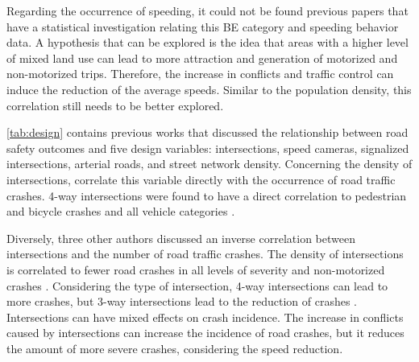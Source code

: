 Regarding the occurrence of speeding, it could not be found previous papers that have a statistical investigation relating this BE category and speeding behavior data. A hypothesis that can be explored is the idea that areas with a higher level of mixed land use can lead to more attraction and generation of motorized and non-motorized trips. Therefore, the increase in conflicts and traffic control can induce the reduction of the average speeds. Similar to the population density, this correlation still needs to be better explored. 

\autoref{tab:design} contains previous works that discussed the relationship between road safety outcomes and five design variables: intersections, speed cameras, signalized intersections, arterial roads, and street network density. Concerning the density of intersections, \textcite{Dumbaugh2011,Dumbaugh2013,Elvik2009,Huang2018} correlate this variable directly with the occurrence of road traffic crashes. 4-way intersections were found to have a direct correlation to pedestrian and bicycle crashes \cite{Dumbaugh2011, Dumbaugh2013} and all vehicle categories \cite{Huang2018}.

Diversely, three other authors discussed an inverse correlation between intersections and the number of road traffic crashes. The density of intersections is correlated to fewer road crashes in all levels of severity \cite{Marshall2011, Ouyang2014} and non-motorized crashes \cite{Zhang2015}. Considering the type of intersection, 4-way intersections can lead to more crashes, but 3-way intersections lead to the reduction of crashes \cite{Ewing2009}. Intersections can have mixed effects on crash incidence. The increase in conflicts caused by intersections can increase the incidence of road crashes, but it reduces the amount of more severe crashes, considering the speed reduction.  


